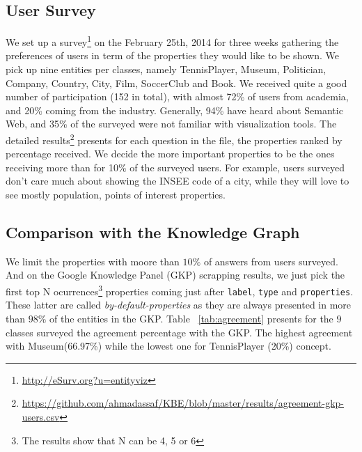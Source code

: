 \documentclass[runningheads,a4paper]{llncs}
\begin{document}
\subsection{User Survey}
\label{sec:survey}
We set up a survey\footnote{\url{http://eSurv.org?u=entityviz}} on the February 25th, 2014 for three weeks gathering the preferences of users in term of the properties they would like to be shown. We pick up nine entities per classes, namely \textsf{TennisPlayer}, \textsf{Museum}, \textsf{Politician}, \textsf{Company}, \textsf{Country}, \textsf{City}, \textsf{Film}, \textsf{SoccerClub} and \textsf{Book}.
We received quite a good number of participation (152 in total), with almost 72\% of users from academia, and 20\% coming from the industry. Generally, 94\% have heard about Semantic Web, and 35\% of the surveyed were not familiar with visualization tools. The detailed results\footnote{\url{https://github.com/ahmadassaf/KBE/blob/master/results/agreement-gkp-users.csv}} presents for each question in the file, the properties ranked by percentage received. We decide the more important properties to be the ones receiving more than for 10\% of the surveyed users.  
 For example, users surveyed don't care much about showing the \textsf{INSEE code} of a city, while they will love to see mostly \textsf{population}, \textsf{points of interest} properties. 

\subsection{Comparison with the Knowledge Graph}
\label{sec:comparison}
We limit the properties with moore than $10\%$ of answers from users surveyed. And on the Google Knowledge Panel (GKP) scrapping  results, we just pick the first top N ocurrences\footnote{The results show that N can be 4, 5 or 6} properties coming just after \texttt{label}, \texttt{type} and \texttt{properties}. These latter are called \textit{by-default-properties} as they are always presented in more than $98\%$ of the entities in the GKP. Table ~\ref{tab:agreement} presents for the $9$ classes surveyed the agreement percentage with the GKP. The highest agreement with \textsf{Museum}(66.97\%) while the lowest one for \textsf{TennisPlayer} (20\%) concept.   
\end{document}
